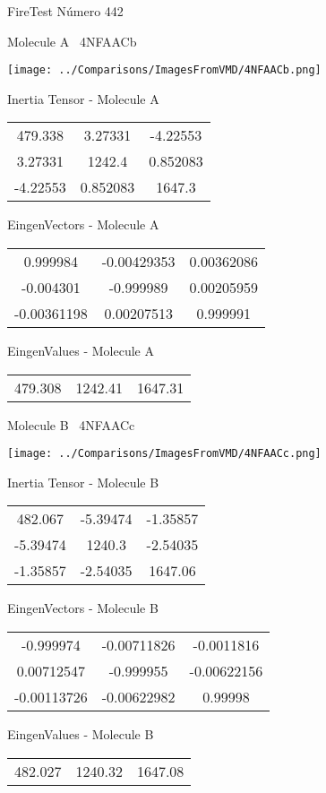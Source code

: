\vtab[-3cm]
\begin{center}
{\large FireTest \tab Número 442}
\end{center}
\begin{multicols}{2}
\begin{center}

Molecule A \
4NFAACb

\texttt{[image: ../Comparisons/ImagesFromVMD/4NFAACb.png]}

Inertia Tensor - Molecule A \\
\begin{tabular}{|c c c|}
479.338	 & 	3.27331	 & 	-4.22553	 \\
3.27331	 & 	1242.4	 & 	0.852083	 \\
-4.22553	 & 	0.852083	 & 	1647.3
\end{tabular}

\vtab
 EingenVectors - Molecule A     \\
\begin{tabular}{|c c c|}
0.999984	 & 	-0.00429353	 & 	0.00362086	 \\
-0.004301	 & 	-0.999989	 & 	0.00205959	 \\
-0.00361198	 & 	0.00207513	 & 	0.999991
\end{tabular}

\vtab
 EingenValues - Molecule A     \\
\begin{tabular}{|c c c|}
479.308	 & 	1242.41	 & 	1647.31	 \\
\end{tabular}
\columnbreak

Molecule B \
4NFAACc

\texttt{[image: ../Comparisons/ImagesFromVMD/4NFAACc.png]}

Inertia Tensor - Molecule B \\
\begin{tabular}{|c c c|}
482.067	 & 	-5.39474	 & 	-1.35857	 \\
-5.39474	 & 	1240.3	 & 	-2.54035	 \\
-1.35857	 & 	-2.54035	 & 	1647.06
\end{tabular}

\vtab
 EingenVectors - Molecule B     \\
\begin{tabular}{|c c c|}
-0.999974	 & 	-0.00711826	 & 	-0.0011816	 \\
0.00712547	 & 	-0.999955	 & 	-0.00622156	 \\
-0.00113726	 & 	-0.00622982	 & 	0.99998
\end{tabular}

\vtab
 EingenValues - Molecule B     \\
\begin{tabular}{|c c c|}
482.027	 & 	1240.32	 & 	1647.08	 \\
\end{tabular}

\end{center}
\end{multicols}

